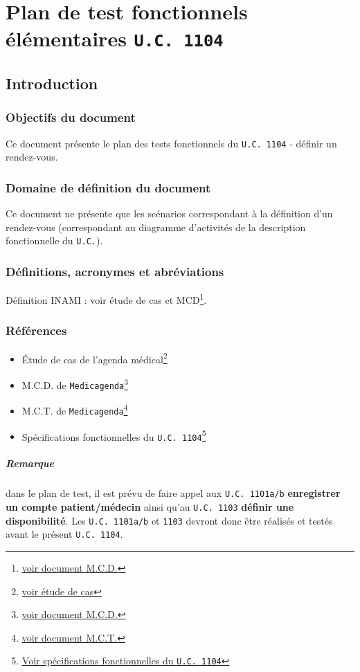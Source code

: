 \chapter{Plan de test fonctionnels élémentaires \texttt{U.C. 1104}}
\section{Introduction}
\subsection{Objectifs du document}
Ce document présente  le plan des tests fonctionnels du \texttt{U.C. 1104} -
définir un rendez-vous. 
\subsection{Domaine de définition du document}
Ce document ne présente que les scénarios correspondant à la définition d’un
rendez-vous (correspondant au diagramme d’activités de la description fonctionnelle
du \texttt{U.C.}).
\subsection{Définitions, acronymes et abréviations}
Définition INAMI : voir étude de cas et MCD\footnote{\href{../MCD/MCD.pdf}{voir document M.C.D.}}.
\subsection{Références}
\begin{itemize}
	\item[] Étude de cas de l'agenda
		médical\footnote{\href{../Enonce_Travail_Synthese_14-15.pdf}{voir
		étude de cas}}
	\item[] M.C.D. de \texttt{Medicagenda}\footnote{\href{../MCD/MCD.pdf}{voir document M.C.D.}}
	\item[] M.C.T. de \texttt{Medicagenda}\footnote{\href{./MCT.pdf}{voir document M.C.T.}}
	\item[] Spécifications fonctionnelles du \texttt{U.C.
		1104}\footnote{\href{./specifications_fonctionnelles_UC_1104_definir_un_rendez-vous.pdf}{Voir
			spécifications fonctionnelles du \texttt{U.C. 1104}}}
	\end{itemize}

	\paragraph{Remarque}
	dans le plan de test, il est prévu de faire appel aux \texttt{U.C. 1101a/b} 
	\textbf{enregistrer un compte patient/médecin} ainsi qu'au \texttt{U.C. 1103}
	\textbf{définir une disponibilité}.
	Les \texttt{U.C. 1101a/b} et \texttt{1103} devront
	donc être réalisés et testés avant le présent \texttt{U.C. 1104}.

